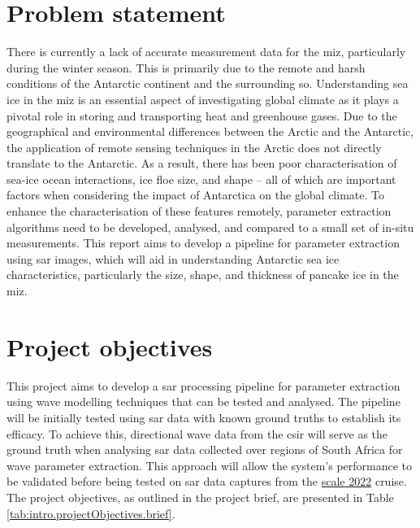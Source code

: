 \section{Problem statement}
\label{sec:intro.problemstatement}
There is currently a lack of accurate measurement data for the \ac{miz}, particularly during the winter season. This is primarily due to the remote and harsh conditions of the Antarctic continent and the surrounding \ac{so}. Understanding sea ice in the \acs{miz} is an essential aspect of investigating global climate as it plays a pivotal role in storing and transporting heat and greenhouse gases. Due to the geographical and environmental differences between the Arctic and the Antarctic, the application of remote sensing techniques in the Arctic does not directly translate to the Antarctic. As a result, there has been poor characterisation of sea-ice ocean interactions, ice floe size, and shape – all of which are important factors when considering the impact of Antarctica on the global climate. To enhance the characterisation of these features remotely, parameter extraction algorithms need to be developed, analysed, and compared to a small set of in-situ measurements. This report aims to develop a pipeline for parameter extraction using \ac{sar} images, which will aid in understanding Antarctic sea ice characteristics, particularly the size, shape, and thickness of pancake ice in the \acs{miz}.
\section{Project objectives}
\label{sec:intro.projectObjectives}
This project aims to develop a \acs{sar} processing pipeline for parameter extraction using wave modelling techniques that can be tested and analysed. The pipeline will be initially tested using \acs{sar} data with known ground truths to establish its efficacy. To achieve this, directional wave data from the \ac{csir} will serve as the ground truth when analysing \acs{sar} data collected over regions of South Africa for wave parameter extraction. This approach will allow the system's performance to be validated before being tested on \acs{sar} data captures from the \href{https://www.sanap.ac.za/scale-winter-cruise-2022}{\ac{scale} 2022} cruise. The project objectives, as outlined in the project brief, are presented in Table \ref{tab:intro.projectObjectives.brief}.

